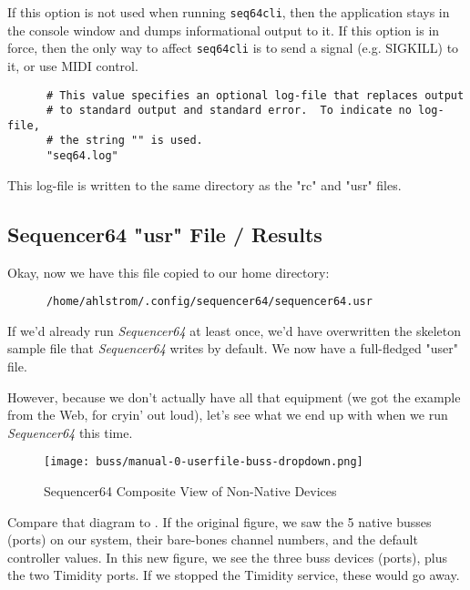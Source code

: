    If this option is not used when running \texttt{seq64cli}, then the
   application stays in the console window and dumps informational output to
   it.  If this option is in force, then the only way to affect
   \texttt{seq64cli} is to send a signal (e.g. SIGKILL) to it, or use
   MIDI control.

   \begin{verbatim}
      # This value specifies an optional log-file that replaces output
      # to standard output and standard error.  To indicate no log-file,
      # the string "" is used.
      "seq64.log"
   \end{verbatim}

   This log-file is written to the same directory as the "rc" and "usr" files.

\subsection{Sequencer64 "usr" File / Results}
\label{subsec:seq64_usr_file_midi_bus_results}

   Okay, now we have this file copied to our home directory:

   \begin{verbatim}
      /home/ahlstrom/.config/sequencer64/sequencer64.usr
   \end{verbatim}

   If we'd already run \textsl{Sequencer64} at least once, we'd have
   overwritten the skeleton sample file that \textsl{Sequencer64}
   writes by default.  We now have a full-fledged "user" file.

   However, because we don't actually have all that equipment (we got the
   example from the Web, for cryin' out loud), let's see what we end up with
   when we run \textsl{Sequencer64} this time.

\begin{figure}[H]
   \centering 
   \texttt{[image: buss/manual-0-userfile-buss-dropdown.png]}
   \caption{Sequencer64 Composite View of Non-Native Devices}
   \label{fig:seq64_manual_0_userfile_buss_dropdown}
\end{figure}

   Compare that diagram to .
   If the original figure, we saw the 5 native busses (ports) on our system,
   their bare-bones channel numbers, and the default controller values.  In
   this new figure, we see the three buss devices (ports), plus the two
   Timidity ports.  If we stopped the Timidity service, these would go away.

